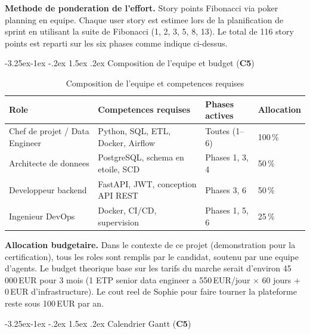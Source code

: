 \documentclass[a4paper,11pt,oneside,openany]{report}
\makeatletter
\renewcommand\subsection{\@startsection{subsection}{2}{\z@}%
  {-3.25ex\@plus -1ex \@minus -.2ex}%
  {1.5ex \@plus .2ex}%
  {\normalfont\large\bfseries\color{ntdarkgreen}}}
\newcommand{\competence}[1]{\textbf{\textcolor{ntgreen}{#1}}}
\makeatother
\begin{document}
\textbf{Methode de ponderation de l'effort.} Story points Fibonacci
via poker planning en equipe. Chaque user story est estimee lors de
la planification de sprint en utilisant la suite de Fibonacci
(1, 2, 3, 5, 8, 13). Le total de 116 story points est reparti sur
les six phases comme indique ci-dessus.

\subsection{Composition de l'equipe et budget (\competence{C5})}

\begin{table}[H]
\centering
\caption{Composition de l'equipe et competences requises}
\label{tab:team}
\begin{tabularx}{\textwidth}{L{3cm} L{3.5cm} L{3cm} C{2cm}}
\toprule
\textbf{Role} & \textbf{Competences requises} & \textbf{Phases actives} & \textbf{Allocation} \\
\midrule
Chef de projet / Data Engineer & Python, SQL, ETL, Docker, Airflow & Toutes (1--6) & 100\,\% \\
Architecte de donnees & PostgreSQL, schema en etoile, SCD & Phases 1, 3, 4 & 50\,\% \\
Developpeur backend & FastAPI, JWT, conception API REST & Phases 3, 6 & 50\,\% \\
Ingenieur DevOps & Docker, CI/CD, supervision & Phases 1, 5, 6 & 25\,\% \\
\bottomrule
\end{tabularx}
\end{table}

\textbf{Allocation budgetaire.} Dans le contexte de ce projet
(demonstration pour la certification), tous les roles sont remplis
par le candidat, soutenu par une equipe d'agents. Le budget
theorique base sur les tarifs du marche serait d'environ
45\,000\,EUR pour 3 mois (1 ETP senior data engineer a
550\,EUR/jour $\times$ 60 jours + 0\,EUR d'infrastructure). Le
cout reel de Sophie pour faire tourner la plateforme reste sous
100\,EUR par an.

\subsection{Calendrier Gantt (\competence{C5})}
\end{document}
